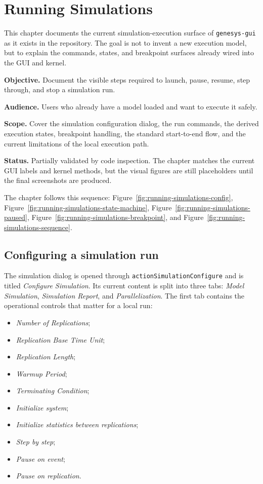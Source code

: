 \chapter{Running Simulations}
\label{chap:running-simulations}

This chapter documents the current simulation-execution surface of
\texttt{genesys-gui} as it exists in the repository. The goal is not to invent a
new execution model, but to explain the commands, states, and breakpoint
surfaces already wired into the GUI and kernel.

\noindent\textbf{Objective.} Document the visible steps required to launch,
pause, resume, step through, and stop a simulation run.

\noindent\textbf{Audience.} Users who already have a model loaded and want to
execute it safely.

\noindent\textbf{Scope.} Cover the simulation configuration dialog, the run
commands, the derived execution states, breakpoint handling, the standard
start-to-end flow, and the current limitations of the local execution path.

\noindent\textbf{Status.} Partially validated by code inspection. The chapter
matches the current GUI labels and kernel methods, but the visual figures are
still placeholders until the final screenshots are produced.

The chapter follows this sequence:
Figure~\ref{fig:running-simulations-config},
Figure~\ref{fig:running-simulations-state-machine},
Figure~\ref{fig:running-simulations-paused},
Figure~\ref{fig:running-simulations-breakpoint}, and
Figure~\ref{fig:running-simulations-sequence}.

\section{Configuring a simulation run}
\label{sec:running-simulations-configuring}

The simulation dialog is opened through \texttt{actionSimulationConfigure} and
is titled \textit{Configure Simulation}. Its current content is split into
three tabs: \textit{Model Simulation}, \textit{Simulation Report}, and
\textit{Parallelization}. The first tab contains the operational controls that
matter for a local run:
\begin{itemize}
\item \textit{Number of Replications};
\item \textit{Replication Base Time Unit};
\item \textit{Replication Length};
\item \textit{Warmup Period};
\item \textit{Terminating Condition};
\item \textit{Initialize system};
\item \textit{Initialize statistics between replications};
\item \textit{Step by step};
\item \textit{Pause on event};
\item \textit{Pause on replication}.
\end{itemize}

